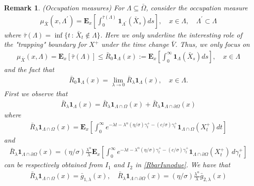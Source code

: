 \documentclass[11pt,a4paper]{article}
\newtheorem{remark}{Remark}[section]
\begin{document}
\begin{remark}
(Occupation measures)   For $\Lambda \subseteq \bar{\Omega}$, consider the occupation measure
\begin{align*}
\mu_{\bar{X}} (x, \Lambda^\prime) = \mathbf{E}_x \left[ \int_0^{\bar{\tau}(\Lambda)} \mathbf{1}_{\Lambda^\prime}(\bar{X}_s) ds \right], \quad x \in \Lambda, \quad \Lambda^\prime \subset \Lambda
\end{align*}
where $\bar{\tau}(\Lambda) = \inf\{t\,:\, \bar{X}_t \notin \Lambda\}$. Here we only underline the interesting role of the "trapping" boundary for $X^+$ under the time change $\bar{V}$. Thus, we only focus on 
\begin{align*}
\mu_{\bar{X}}(x, \Lambda) = \mathbf{E}_x [\bar{\tau}(\Lambda)] \leq \bar{R}_0 \mathbf{1}_\Lambda (x) := \mathbf{E}_x \left[ \int_0^\infty \mathbf{1}_\Lambda(\bar{X}_s) ds \right], \quad x \in \Lambda
\end{align*}
and the fact that
\begin{align*}
\bar{R}_0 \mathbf{1}_\Lambda (x) = \lim_{\lambda \to 0} \bar{R}_\lambda \mathbf{1}_{\Lambda}(x), \quad x \in \Lambda.
\end{align*} 
First we observe that
\begin{align*}
\bar{R}_\lambda \mathbf{1}_{\Lambda}(x) = \bar{R}_\lambda \mathbf{1}_{\Lambda \cap \Omega}(x) + \bar{R}_\lambda \mathbf{1}_{\Lambda \cap \partial \Omega}(x)
\end{align*}
where
\begin{align*}
\bar{R}_\lambda \mathbf{1}_{\Lambda \cap \Omega}(x) = \mathbf{E}_x\left[ \int_0^\infty e^{- \lambda t - \lambda^\alpha (\eta/\sigma) \gamma^+_t - (c/\sigma) \gamma^+_t } \mathbf{1}_{\Lambda \cap \Omega}(X^+_t) dt \right]
\end{align*}
and
\begin{align*}
\bar{R}_\lambda \mathbf{1}_{\Lambda \cap \partial \Omega}(x) = (\eta/\sigma) \frac{\lambda^\alpha}{\lambda} \mathbf{E}_x\left[ \int_0^\infty e^{- \lambda t -\lambda^\alpha (\eta/\sigma) \gamma^+_t - (c/\sigma) \gamma^+_t } \mathbf{1}_{\Lambda \cap \partial \Omega}(X^+_t) \, d\gamma^+_t \right]
\end{align*}
can be respectively obtained from $I_1$ and $I_2$ in \eqref{RbarIunodue}. We have that
\begin{align*}
\bar{R}_\lambda \mathbf{1}_{\Lambda \cap \Omega}(x) = \bar{g}_{1,\lambda}(x), \quad \bar{R}_\lambda \mathbf{1}_{\Lambda \cap \partial \Omega}(x) = (\eta/\sigma) \frac{\lambda^\alpha}{\lambda} \bar{g}_{2,\lambda}(x)
\end{align*}

\end{remark}
\end{document}
